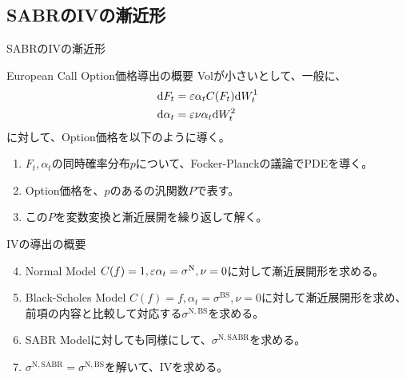 \documentclass[dvipdfmx,9pt]{beamer}
\begin{document}
\subsection{SABRのIVの漸近形}
\begin{frame}{SABRのIVの漸近形}
  \begin{block}{European Call Option価格導出の概要}
    Volが小さいとして、一般に、
    \begin{align}
      \dd F_{t}      & = \varepsilon \alpha_{t} C(F_{t}) \dd W_{t}^{1} \\
      \dd \alpha_{t} & = \varepsilon \nu \alpha_{t} \dd W_{t}^{2}
    \end{align}
    に対して、Option価格を以下のように導く。
    \begin{enumerate}
      \item $F_{t},\alpha_{t}$の同時確率分布$p$について、Focker-Planckの議論でPDEを導く。
      \item Option価格を、$p$のあるの汎関数$P$で表す。
      \item この$P$を変数変換と漸近展開を繰り返して解く。
    \end{enumerate}
  \end{block}
  \begin{block}{IVの導出の概要}
    \begin{enumerate}
      \setcounter{enumi}{3}
      \item Normal Model $C(f) = 1, \varepsilon\alpha_{t} = \sigma^{\mathrm{N}},\nu = 0$に対して漸近展開形を求める。
      \item Black-Scholes Model $C(f) = f, \alpha_{t} = \sigma^{\mathrm{BS}},\nu = 0$に対して漸近展開形を求め、前項の内容と比較して対応する$\sigma^{\mathrm{N,BS}}$を求める。
      \item SABR Modelに対しても同様にして、$\sigma^{\mathrm{N,SABR}}$を求める。
      \item $\sigma^{\mathrm{N,SABR}} = \sigma^{\mathrm{N,BS}}$を解いて、IVを求める。
    \end{enumerate}
  \end{block}
\end{frame}
\end{document}
